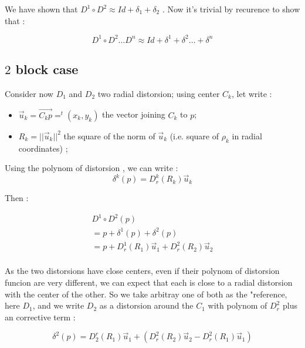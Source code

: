 We have shown that $D^1 \circ D^2  \approx Id + \delta_1 + \delta_2$ .  Now it's trivial by recurence to
show that :

\begin{equation}
     D^1 \circ D^2   \dots D^n  \approx Id + \delta^1 + \delta^2 \dots + \delta^n
\end{equation}


\subsection{$2$ block case}

Consider now $D_1$ and $D_2$ two  radial distorsion; using center $C_k$, let write :

\begin{itemize}
	\item $\vec{u}_k = \overrightarrow{C_k p} = ^t (x_k,y_k) $ the vector joining $C_k$ to $p$;
	\item $R_k = ||\vec{u}_k||^2$  the square of the norm of $\vec{u}_k$ (i.e.  square of $\rho_k$ in radial coordinates) ;
\end{itemize}


Using the polynom  of distorsion , we can write :
\begin{equation}
	\delta^k(p) =   D^k_r(R_k) \vec{u}_k 
\end{equation}

Then :

\begin{equation}
\begin{multlined}
	D^1 \circ D^2 (p)  \\
	= p +\delta^1(p) +\delta^2(p) \\
	= p +    D^1_r(R_1) \vec{u}_1  +  D^2_r(R_2) \vec{u}_2  \\
\end{multlined}
\end{equation}

As the two distorsions have close centers, even if their polynom of distorsion funcion are very different,
we can expect that each is close to a radial distorsion with the center of the other.
So we take arbitray one of both as the "reference, here  $D_1$,
and we write $D_2$ as a distorsion around the $C_1$ with polynom of $D^2_r$  plus an corrective term :

\begin{equation}
	\delta^2(p) =   D^r_2(R_1) \vec{u}_1  + ( D^2_r(R_2) \vec{u}_2 - D^2_r(R_1) \vec{u}_1 )
\end{equation}

